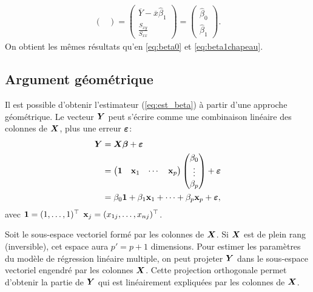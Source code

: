 \begin{exemple}
\begin{align*}
\begin{pmatrix}
        \end{pmatrix} 
        = \begin{pmatrix}
        \overline{Y} - \overline{x} \widehat{\beta}_1 \\
            \frac{\displaystyle S_{xy}}{\displaystyle S_{xx}}
        \end{pmatrix}
        = \begin{pmatrix}
            \widehat{\beta}_0 \\\widehat{\beta}_1
        \end{pmatrix}.
    \end{align*}
    On obtient les mêmes résultats qu'en \eqref{eq:beta0} et \eqref{eq:beta1chapeau}.
\end{exemple}


\subsection{Argument géométrique}
\label{sec:ArgumentGéométrique}

Il est possible d'obtenir l'estimateur (\ref{eq:est_beta}) à partir d'une approche géométrique. Le vecteur $\bm{Y}$ peut s'écrire comme une combinaison linéaire des colonnes de $\bm{X}$, plus une erreur $\bm\varepsilon$:
\begin{align*}
\bm{Y} &= \bm{X} \bm\beta + \bm\varepsilon \\
    &=   \begin{pmatrix}
        \bf 1 & \bold{x}_{1}  & \cdots & \bold x_{p}  
    \end{pmatrix}
    \begin{pmatrix}
        \beta_0 \\
        \vdots \\
        \beta_p 
    \end{pmatrix}
    +    \bm\varepsilon \\
    &= \beta_0 {\bf 1} + \beta_1 {\bold x}_{1} + \dots + \beta_p \bold x_{p} + \bm\varepsilon,
\end{align*}
avec $\bold 1 = (1, \dots, 1)^\top$ $\bold x_j = (x_{1j}, \dots, x_{nj})^\top$.

Soit le sous-espace vectoriel formé par les colonnes de $\bm{X}$. Si $\bm{X}$ est de plein rang (inversible), cet espace aura $p'=p+1$ dimensions. Pour estimer les paramètres du modèle de régression linéaire multiple, on peut projeter $\bm{Y}$ dans le sous-espace vectoriel engendré par les colonnes $\bm{X}$. Cette projection orthogonale permet d'obtenir la partie de $\bm{Y}$ qui est linéairement expliquées par les colonnes de $\bm{X}$.

